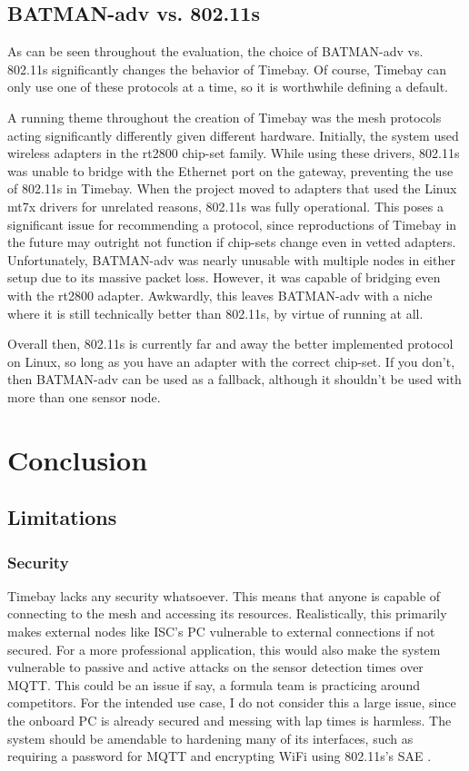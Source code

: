 \documentclass[journal]{IEEEtran}
\begin{document}
\subsection{BATMAN-adv vs. 802.11s}
As can be seen throughout the evaluation, the choice of BATMAN-adv vs. 802.11s significantly changes the behavior of Timebay. Of course, Timebay can only use one of these protocols at a time, so it is worthwhile defining a default.

A running theme throughout the creation of Timebay was the mesh protocols acting significantly differently given different hardware. Initially, the system used wireless adapters in the rt2800 chip-set family. While using these drivers, 802.11s was unable to bridge with the Ethernet port on the gateway, preventing the use of 802.11s in Timebay. When the project moved to adapters that used the Linux mt7x drivers for unrelated reasons, 802.11s was fully operational. This poses a significant issue for recommending a protocol, since reproductions of Timebay in the future may outright not function if chip-sets change even in vetted adapters. Unfortunately, BATMAN-adv was nearly unusable with multiple nodes in either setup due to its massive packet loss. However, it was capable of bridging even with the rt2800 adapter. Awkwardly, this leaves BATMAN-adv with a niche where it is still technically better than 802.11s, by virtue of running at all.

Overall then, 802.11s is currently far and away the better implemented protocol on Linux, so long as you have an adapter with the correct chip-set. If you don't, then BATMAN-adv can be used as a fallback, although it shouldn't be used with more than one sensor node.

\section{Conclusion}

\subsection{Limitations}

\subsubsection{Security}
Timebay lacks any security whatsoever. This means that anyone is capable of connecting to the mesh and accessing its resources. Realistically, this primarily makes external nodes like ISC's PC vulnerable to external connections if not secured. For a more professional application, this would also make the system vulnerable to passive and active attacks on the sensor detection times over MQTT. This could be an issue if say, a formula team is practicing around competitors. For the intended use case, I do not consider this a large issue, since the onboard PC is already secured and messing with lap times is harmless. The system should be amendable to hardening many of its interfaces, such as requiring a password for MQTT and encrypting WiFi using 802.11s's SAE \cite{en:developers:documentation:ieee80211:802.11s}.
\end{document}
